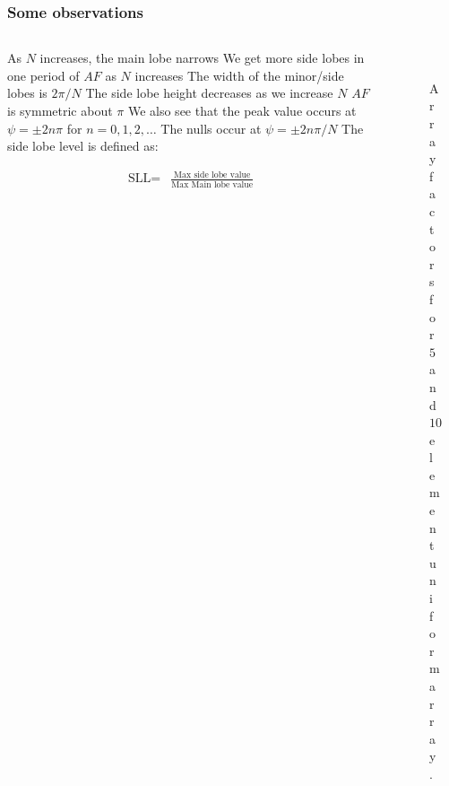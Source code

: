 \documentclass[10pt]{beamer}
\begin{document}
\begin{frame}
    \frametitle{Some observations}

    \begin{columns}[T] %
        \begin{column}{.6\textwidth}
            \begin{outline}
                \small
                \1 As $N $ increases, the main lobe narrows
                \1 We get more side lobes in one period of $AF$ as $N$ increases
                \1 The width of the minor/side lobes is $2\pi/N$
                \1 The side lobe height decreases as we increase $N$
                \1 $AF $ is symmetric about $\pi$ 
                \1 We also see that the peak value occurs at $\psi =\pm 2 n \pi$ for $n = 0,1,2, \dots$
                \1 The nulls occur at $\psi =\pm 2 n \pi/N$
                \1 The side lobe level is defined as:
            \end{outline}
\begin{align*}
    \text{SLL} {}=& \frac{\text{Max side lobe value}}{\text{Max Main lobe value}}
\end{align*}
        \end{column}
        \begin{column}{.5\textwidth}
            \begin{figure}[!htbp]
                \centering
                \\
                \caption{Array factors for $5$ and $10$ element uniform array.}
                \label{fig:E_z fields}
              \end{figure}
        \end{column}%
    \end{columns}
    \normalsize
\end{frame}
\end{document}
